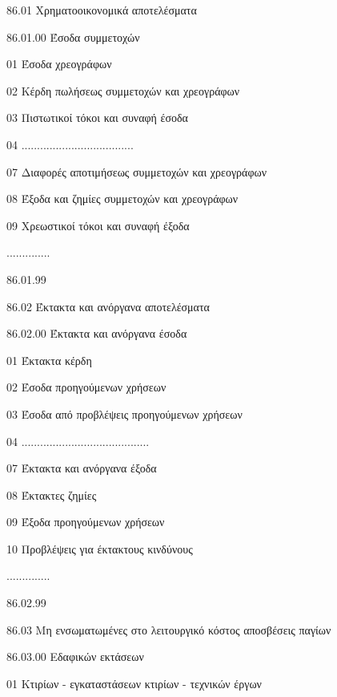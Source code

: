 \documentclass[A4,10pt,greek]{book}
\begin{document}
        86.01    Χρηματοοικονομικά αποτελέσματα

                     86.01.00    Έσοδα συμμετοχών

                               01    Έσοδα χρεογράφων

                               02    Κέρδη πωλήσεως συμμετοχών και χρεογράφων

                               03    Πιστωτικοί τόκοι και συναφή έσοδα

                               04    ....................................

                               07    Διαφορές αποτιμήσεως συμμετοχών και χρεογράφων

                               08    Έξοδα και ζημίες συμμετοχών και χρεογράφων

                               09    Χρεωστικοί τόκοι και συναφή έξοδα

                     ..............

                     86.01.99

        86.02    Έκτακτα και ανόργανα αποτελέσματα

                     86.02.00    Έκτακτα και ανόργανα έσοδα

                               01    Έκτακτα κέρδη

                               02    Έσοδα προηγούμενων χρήσεων

                               03    Έσοδα από προβλέψεις προηγούμενων χρήσεων

                               04    .........................................

                               07    Έκτακτα και ανόργανα έξοδα

                               08    Έκτακτες ζημίες

                               09    Έξοδα προηγούμενων χρήσεων

                               10    Προβλέψεις για έκτακτους κινδύνους

                     ..............

                     86.02.99

        86.03    Μη ενσωματωμένες στο λειτουργικό κόστος αποσβέσεις παγίων

                     86.03.00    Εδαφικών εκτάσεων

                               01    Κτιρίων - εγκαταστάσεων κτιρίων - τεχνικών έργων
\end{document}
